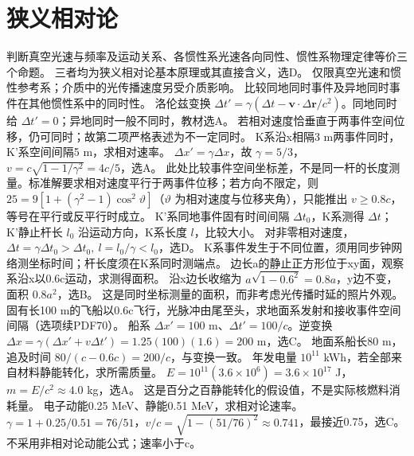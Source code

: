 \section{狭义相对论}
\problemtext 判断真空光速与频率及运动关系、各惯性系光速各向同性、惯性系物理定律等价三个命题。
\workings 三者均为狭义相对论基本原理或其直接含义，选D。
\crosscheck 仅限真空光速和惯性参考系；介质中的光传播速度另受介质影响。
\problemtext 比较同地同时事件及异地同时事件在其他惯性系中的同时性。
\workings 洛伦兹变换 $\Delta t'=\gamma(\Delta t-\bm v\cdot\Delta\bm r/c^2)$。同地同时给 $\Delta t'=0$；异地同时一般不同时，教材选A。
\crosscheck 若相对速度恰垂直于两事件空间位移，仍可同时；故第二项严格表述为不一定同时。
\problemtext K系沿x相隔3 m两事件同时，K'系空间间隔5 m，求相对速率。
\workings $\Delta x'=\gamma\Delta x$，故 $\gamma=5/3$，$v=c\sqrt{1-1/\gamma^2}=4c/5$，选A。
\crosscheck 此处比较事件空间坐标差，不是同一杆的长度测量。标准解要求相对速度平行于两事件位移；若方向不限定，则 $25=9[1+(\gamma^2-1)\cos^2\vartheta]$（$\vartheta$ 为相对速度与位移夹角），只能推出 $v\ge0.8c$，等号在平行或反平行时成立。
\problemtext K'系同地事件固有时间间隔 $\Delta t_0$，K系测得 $\Delta t$；K'静止杆长 $l_0$ 沿运动方向，K系长度 $l$，比较大小。
\workings 对非零相对速度，$\Delta t=\gamma\Delta t_0>\Delta t_0,\ l=l_0/\gamma<l_0$，选D。
\crosscheck K系事件发生于不同位置，须用同步钟网络测坐标时间；杆长度须在K系同时测端点。
\problemtext 边长a的静止正方形位于xy面，观察系沿x以0.6c运动，求测得面积。
\workings 沿x边长收缩为 $a\sqrt{1-0.6^2}=0.8a$，y边不变，面积 $0.8a^2$，选B。
\crosscheck 这是同时坐标测量的面积，而非考虑光传播时延的照片外观。
\problemtext 固有长100 m的飞船以0.6c飞行，光脉冲由尾至头，求地面系发射和接收事件空间间隔（选项续PDF70）。
\workings 船系 $\Delta x'=100$ m、$\Delta t'=100/c$。逆变换 $\Delta x=\gamma(\Delta x'+v\Delta t')=1.25(100)(1.6)=200$ m，选C。
\crosscheck 地面系船长80 m，追及时间 $80/(c-0.6c)=200/c$，与变换一致。
\problemtext 年发电量 $10^{11}$ kWh，若全部来自材料静能转化，求所需质量。
\workings $E=10^{11}(3.6\times10^6)=3.6\times10^{17}$ J，$m=E/c^2\approx4.0$ kg，选A。
\crosscheck 这是百分之百静能转化的假设值，不是实际核燃料消耗量。
\problemtext 电子动能0.25 MeV、静能0.51 MeV，求相对论速率。
\workings $\gamma=1+0.25/0.51=76/51$，$v/c=\sqrt{1-(51/76)^2}\approx0.741$，最接近0.75，选C。
\crosscheck 不采用非相对论动能公式；速率小于c。

